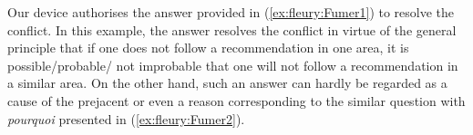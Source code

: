 \documentclass[output=paper,colorlinks,citecolor=brown,
]{langscibook}
\begin{document}
Our device authorises the answer provided in (\ref{ex:fleury:Fumer1}) to resolve the conflict.
In this example, the answer resolves the conflict in virtue of the general principle that if one does not follow a recommendation in one area, it is possible/probable/ not improbable that one will not follow a recommendation in a similar area. On the other hand, such an answer can hardly be regarded as a cause of the prejacent or even a reason corresponding to the similar question with \textit{pourquoi} presented in (\ref{ex:fleury:Fumer2}).


\printbibliography[heading=subbibliography,notkeyword=this]
\end{document}
